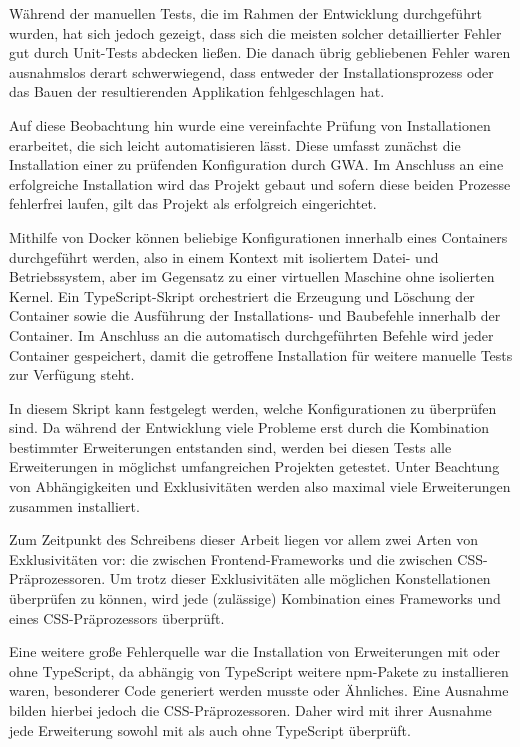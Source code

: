 Während der manuellen Tests, die im Rahmen der Entwicklung durchgeführt wurden, hat sich jedoch gezeigt, dass sich die meisten solcher detaillierter Fehler gut durch Unit-Tests abdecken ließen. Die danach übrig gebliebenen Fehler waren ausnahmslos derart schwerwiegend, dass entweder der Installationsprozess oder das Bauen der resultierenden Applikation fehlgeschlagen hat.

Auf diese Beobachtung hin wurde eine vereinfachte Prüfung von Installationen erarbeitet, die sich leicht automatisieren lässt. Diese umfasst zunächst die Installation einer zu prüfenden Konfiguration durch \gls{GWA}. Im Anschluss an eine erfolgreiche Installation wird das Projekt gebaut und sofern diese beiden Prozesse fehlerfrei laufen, gilt das Projekt als erfolgreich eingerichtet.

Mithilfe von Docker können beliebige Konfigurationen innerhalb eines Containers durchgeführt werden, also in einem Kontext mit isoliertem Datei- und Betriebssystem, aber im Gegensatz zu einer virtuellen Maschine ohne isolierten Kernel. Ein TypeScript-Skript orchestriert die Erzeugung und Löschung der Container sowie die Ausführung der Installations- und Baubefehle innerhalb der Container. Im Anschluss an die automatisch durchgeführten Befehle wird jeder Container gespeichert, damit die getroffene Installation für weitere manuelle Tests zur Verfügung steht.

In diesem Skript kann festgelegt werden, welche Konfigurationen zu überprüfen sind. Da während der Entwicklung viele Probleme erst durch die Kombination bestimmter Erweiterungen entstanden sind, werden bei diesen Tests alle Erweiterungen in möglichst umfangreichen Projekten getestet. Unter Beachtung von Abhängigkeiten und Exklusivitäten werden also maximal viele Erweiterungen zusammen installiert.

Zum Zeitpunkt des Schreibens dieser Arbeit liegen vor allem zwei Arten von Exklusivitäten vor: die zwischen Frontend-Frameworks und die zwischen CSS-Präprozessoren. Um trotz dieser Exklusivitäten alle möglichen Konstellationen überprüfen zu können, wird jede (zulässige) Kombination eines Frameworks und eines CSS-Präprozessors überprüft.

Eine weitere große Fehlerquelle war die Installation von Erweiterungen mit oder ohne TypeScript, da abhängig von TypeScript weitere \gls{npm}-Pakete zu installieren waren, besonderer Code generiert werden musste oder Ähnliches. Eine Ausnahme bilden hierbei jedoch die CSS-Präprozessoren. Daher wird mit ihrer Ausnahme jede Erweiterung sowohl mit als auch ohne TypeScript überprüft.


